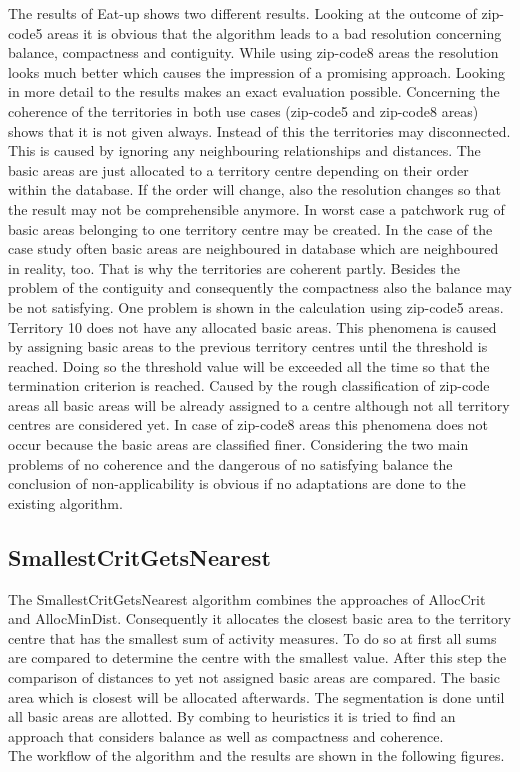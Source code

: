 The results of Eat-up shows two different results. Looking at the outcome of zip-code5 areas it is obvious that the algorithm leads to a bad resolution concerning balance, compactness and contiguity. While using zip-code8 areas the resolution looks much better which causes the impression of a promising approach. Looking in more detail to the results makes an exact evaluation possible. Concerning the coherence of the territories in both use cases (zip-code5 and zip-code8 areas) shows that it is not given always. Instead of this the territories may disconnected. This is caused by ignoring any neighbouring relationships and distances. The basic areas are just allocated to a territory centre depending on their order within the database. If the order will change, also the resolution changes so that the result may not be comprehensible anymore. In worst case a patchwork rug of basic areas belonging to one territory centre may be created. In the case of the case study often basic areas are neighboured in database which are neighboured in reality, too. That is why the territories are coherent partly. Besides the problem of the contiguity and consequently the compactness also the balance may be not satisfying. One problem is shown in the calculation using zip-code5 areas. Territory 10 does not have any allocated basic areas. This phenomena is caused by assigning basic areas to the previous territory centres until the threshold is reached. Doing so the threshold value will be exceeded all the time so that the termination criterion is reached. Caused by the rough classification of zip-code areas all basic areas will be already assigned to a centre although not all territory centres are considered yet. In case of zip-code8 areas this phenomena does not occur because the basic areas are classified finer. Considering the two main problems of no coherence and the dangerous of no satisfying balance the conclusion of non-applicability is obvious if no adaptations are done to the existing algorithm.
 

\subsection{SmallestCritGetsNearest}

The SmallestCritGetsNearest algorithm combines the approaches of AllocCrit and AllocMinDist. Consequently it allocates the closest basic area to the territory centre that has the smallest sum of activity measures. To do so at first all sums are compared to determine the centre with the smallest value. After this step the comparison of distances to yet not assigned basic areas are compared. The basic area which is closest will be allocated afterwards. The segmentation is done until all basic areas are allotted. By combing to heuristics it is tried to find an approach that considers balance as well as compactness and coherence.\\
The workflow of the algorithm and the results are shown in the following figures.


